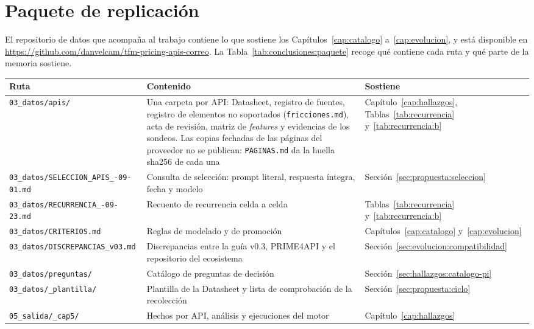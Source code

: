 \section{Paquete de replicación}\label{sec:conclusiones:replicacion}

El repositorio de datos que acompaña al trabajo contiene lo que sostiene los Capítulos~\ref{cap:catalogo} a~\ref{cap:evolucion}, y está disponible en \url{https://github.com/danvelcam/tfm-pricing-apis-correo}.
La Tabla~\ref{tab:conclusiones:paquete} recoge qué contiene cada ruta y qué parte de la memoria sostiene.

\begin{table}[H]
\centering
\small
\setlength{\tabcolsep}{3pt}
\begin{tabular}{|p{4.6cm}|p{6.2cm}|p{3.2cm}|}
\hline
\textbf{Ruta} & \textbf{Contenido} & \textbf{Sostiene} \\
\hline
\texttt{03\_datos/apis/} & Una carpeta por API: Datasheet, registro de fuentes, registro de elementos no soportados (\texttt{fricciones.md}), acta de revisión, matriz de \textit{features} y evidencias de los sondeos. Las copias fechadas de las páginas del proveedor no se publican: \texttt{PAGINAS.md} da la huella sha256 de cada una & Capítulo~\ref{cap:hallazgos}, Tablas~\ref{tab:recurrencia} y~\ref{tab:recurrencia:b} \\
\hline
\texttt{03\_datos/SELECCION\_\allowbreak APIS\_\allowbreak 2026-09-01.md} & Consulta de selección: prompt literal, respuesta íntegra, fecha y modelo & Sección~\ref{sec:propuesta:seleccion} \\
\hline
\texttt{03\_datos/RECURRENCIA\_\allowbreak 2026-09-23.md} & Recuento de recurrencia celda a celda & Tablas~\ref{tab:recurrencia} y~\ref{tab:recurrencia:b} \\
\hline
\texttt{03\_datos/CRITERIOS.md} & Reglas de modelado y de promoción & Capítulos~\ref{cap:catalogo} y~\ref{cap:evolucion} \\
\hline
\texttt{03\_datos/DISCREPANCIAS\_\allowbreak v03.md} & Discrepancias entre la guía v0.3, PRIME4API y el repositorio del ecosistema & Sección~\ref{sec:evolucion:compatibilidad} \\
\hline
\texttt{03\_datos/preguntas/} & Catálogo de preguntas de decisión & Sección~\ref{sec:hallazgos:catalogo-pi} \\
\hline
\texttt{03\_datos/\_plantilla/} & Plantilla de la Datasheet y lista de comprobación de la recolección & Sección~\ref{sec:propuesta:ciclo} \\
\hline
\texttt{05\_salida/\_cap5/} & Hechos por API, análisis y ejecuciones del motor & Capítulo~\ref{cap:hallazgos} \\

\end{tabular}
\end{table}

